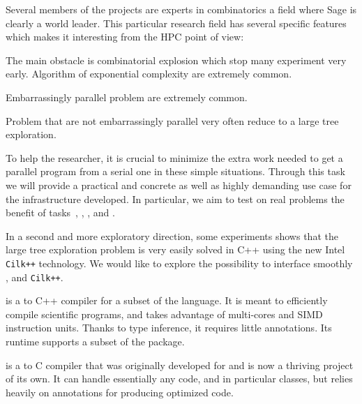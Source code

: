 \begin{workpackage}[id=hpc,wphases=36-48,
  title=High Performance Computing,
  PSRM=1, %
  LLRM=12, %
  SARM=1, %
  UKRM=1, %
  UBRM=1, %
  UJFRM=12]
\begin{tasklist}
\begin{task}[title=HPC infrastructure for combinatorics,id=hpc-combi]
  Several members of the projects are experts in combinatorics a field where
  Sage is clearly a world leader. This particular research field has several
  specific features which makes it interesting from the HPC point of view:
  \begin{compactitem}
  \item The main obstacle is combinatorial explosion which stop many
    experiment very early. Algorithm of exponential complexity are extremely
    common.
  \item Embarrassingly parallel problem are extremely common.
  \item Problem that are not embarrassingly parallel very often reduce to a
    large tree exploration.
  \end{compactitem}
  To help the researcher, it is crucial to minimize the extra work needed to
  get a parallel program from a serial one in these simple situations. Through
  this task we will provide a practical and concrete as well as highly
  demanding use case for the infrastructure developed. In particular, we aim
  to test on real problems the benefit of tasks~,
  , ,
  and .

  In a second and more exploratory direction, some experiments shows that the
  large tree exploration problem is very easily solved in C++ using the new
  Intel \texttt{Cilk++} technology. We would like to explore the possibility to
  interface smoothly \Pythran, \Cython and \texttt{Cilk++}.
\end{task}

\begin{task}[title=Pythran-Cython convergence,id=pythran-cython]

  \Pythran is a \Python to C++ compiler for a subset of the \Python
  language. It is meant to efficiently compile scientific programs,
  and takes advantage of multi-cores and SIMD instruction units.
  Thanks to type inference, it requires little annotations. Its runtime
  supports a subset of the \Numpy package.

  \Cython is a \Python to C compiler that was originally developed for
  \Sage and is now a thriving project of its own. It can handle
  essentially any \Python code, and in particular classes, but relies
  heavily on annotations for producing optimized code.


\end{task}
\end{tasklist}
\end{workpackage}
